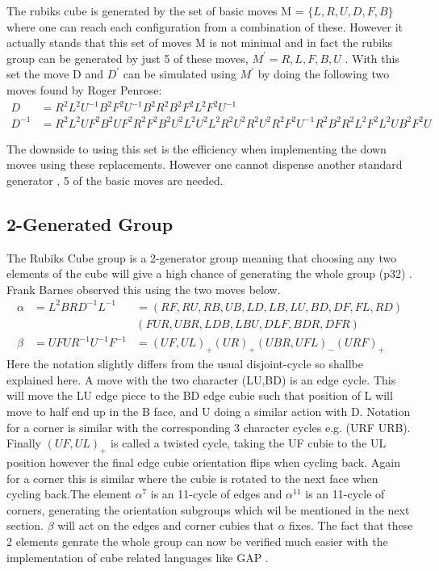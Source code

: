 \documentclass{article}
\newcounter{lem}[section]\setcounter{lem}{0}
\begin{document}
The rubiks cube is generated by the set of basic moves M = $\{L,R,U,D,F,B\}$ where one can reach each configuration from a combination of these. However it actually stands that this set of moves M is not minimal and in fact the rubiks group can be generated by just 5 of these moves, $M^{'} = R,L,F,B,U$ \cite{bandelow2012inside}. With this set the move D and $D^{'}$ can be simulated using $M^{'}$ by doing the following two moves found by Roger Penrose:
\begin{align*}
D &= R^{2}L^{2}U^{-1}B^{2}F^{2}U^{-1}B^{2}R^{2}B^{2}F^{2}L^{2}F^{2}U^{-1} \\
D^{-1} &= R^{2}L^{2}UF^{2}B^{2}UF^{2}R^{2}F^{2}B^{2}U^{2}L^{2}U^{2}L^{2}R^{2}U^{2}R^{2}U^{2}R^{2}F^{2}U^{-1}R^{2}B^{2}R^{2}L^{2}F^{2}L^{2}UB^{2}F^{2}U
\end{align*}

The downside to using this set is the efficiency when implementing the down moves using these replacements. However one cannot dispense another standard generator , 5 of the basic moves are needed.

\subsection{2-Generated Group}

The Rubiks Cube group is a 2-generator group meaning that choosing any two elements of the cube will give a high chance of generating the whole group (p32) \cite{Magic}. Frank Barnes observed this using the two moves below.
\begin{align*}
\alpha &= L^{2}BRD^{-1}L^{-1} &= (RF,RU,RB,UB,LD,LB,LU,BD,DF,FL,RD)\\& &(FUR,UBR,LDB,LBU,DLF,BDR,DFR) \\
\beta &= UFUR^{-1}U^{-1}F^{-1} &= (UF,UL)_{+}(UR)_{+}(UBR,UFL)_{-}(URF)_{+} 
\end{align*}
Here the notation slightly differs from the usual disjoint-cycle so shallbe explained here. A move with the two character (LU,BD) is an edge cycle. This will move the LU edge piece to the BD edge cubie such that position of L will move to half end up in the B face, and U doing a similar action with D. Notation for a corner is similar with the corresponding 3 character cycles e.g. (URF URB). Finally $(UF,UL)_{+}$ is called a twisted cycle, taking the UF cubie to the UL position however the final edge cubie orientation flips when cycling back. Again for a corner this is similar where the cubie is rotated to the next face when cycling back.\newline The element $\alpha^{7}$ is an 11-cycle of edges and $\alpha^{11}$ is an 11-cycle of corners, generating the orientation subgroups which wil be mentioned in the next section. $\beta$ will act on the edges and corner cubies that $\alpha$ fixes. The fact that these 2 elements genrate the whole group can now be verified much easier with the implementation of cube related languages like GAP \cite{GAP}.
\end{document}
